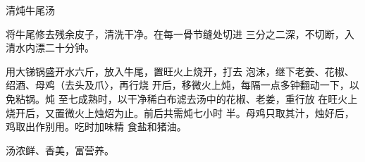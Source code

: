 \begin{recipe}{清炖牛尾汤}

\ingredients



\cooking

将牛尾修去残余皮子，清洗干净。在每一骨节缝处切进 三分之二深，不切断，入清水内漂二十分钟。

用大锑锅盛开水六斤，放入牛尾，置旺火上烧开，打去 泡沫，继下老姜、花椒、绍酒、母鸡（去头及爪〉，再行烧 开后，移微火上炖，每隔一点多钟翻动一下，以免粘锅。炖 至七成熟时，以干净稀白布滤去汤中的花椒、老姜，重行放 在旺火上烧开后，又置微火上烛炤为止。前后共需炖七小时 半。母鸡只取其汁，烛好后，鸡取出作别用。吃时加味精 食盐和猪油。

\notes

汤浓鲜、香美，富营养。

\end{recipe}

